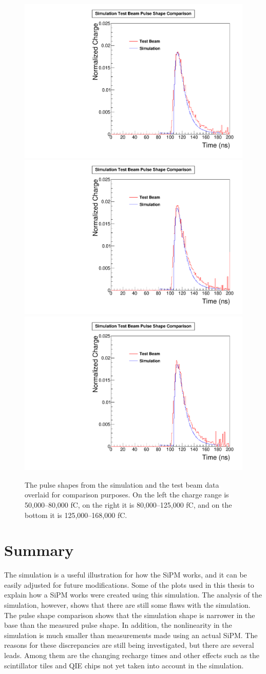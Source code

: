 \begin{figure}
\centering
\includegraphics[width=0.495\linewidth]{Figures/50Comparison.pdf}
\includegraphics[width=0.495\linewidth]{Figures/80Comparison.pdf}
\includegraphics[width=0.495\linewidth]{Figures/125Comparison.pdf}
\caption{The pulse shapes from the simulation and the test beam data overlaid for comparison purposes. On the left the charge range is 50,000--80,000 fC, on the right it is 80,000--125,000 fC, and on the bottom it is 125,000--168,000 fC.}
\label{fig:2comparison_together}
\end{figure}

\section{Summary}

The simulation is a useful illustration for how the SiPM works, and it can be easily adjusted for future modifications. Some of the plots used in this thesis to explain how a SiPM works were created using this simulation. The analysis of the simulation, however, shows that there are still some flaws with the simulation. The pulse shape comparison shows that the simulation shape is narrower in the base than the measured pulse shape. In addition, the nonlinearity in the simulation is much smaller than measurements made using an actual SiPM. The reasons for these discrepancies are still being investigated, but there are several leads. Among them are the changing recharge times and other effects such as the scintillator tiles and QIE chips not yet taken into account in the simulation. 